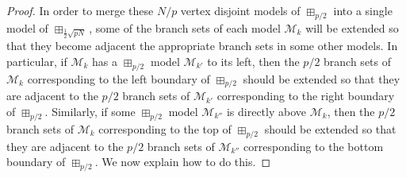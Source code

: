 \documentclass[lotsofwhite]{patmorin}
\newcommand{\boxprod}{\mathbin{\Box}}
\DeclarePairedDelimiter{\ceil}{\lceil}{\rceil}
\renewcommand{\emptyset}{\varnothing}
\renewcommand{\le}{\leqslant}
\theoremstyle{plain}
\theoremstyle{definition}
\begin{document}
\begin{proof}

  In order to merge these $N/p$ vertex disjoint models of $\boxplus_{p/2}$ into a single model of $\boxplus_{\tfrac 12\sqrt{pN}}$, some of the branch sets of each model $\mathcal{M}_k$ will be extended so that they become adjacent the appropriate branch sets in some other models.  In particular, if $\mathcal{M}_k$ has a $\boxplus_{p/2}$ model $\mathcal{M}_{k'}$ to its left, then the $p/2$ branch sets of $\mathcal{M}_k$ corresponding to the left boundary of $\boxplus_{p/2}$ should be extended so that they are adjacent to the $p/2$ branch sets of $\mathcal{M}_{k'}$ corresponding to the right boundary of $\boxplus_{p/2}$.  Similarly, if some $\boxplus_{p/2}$ model $\mathcal{M}_{k''}$ is directly above $\mathcal{M}_k$, then the $p/2$ branch sets of $\mathcal{M}_k$ corresponding to the top of $\boxplus_{p/2}$ should be extended so that they are adjacent to the $p/2$ branch sets of $\mathcal{M}_{k''}$ corresponding to the bottom boundary of $\boxplus_{p/2}$.  We now explain how to do this.


\end{proof}
\end{document}
